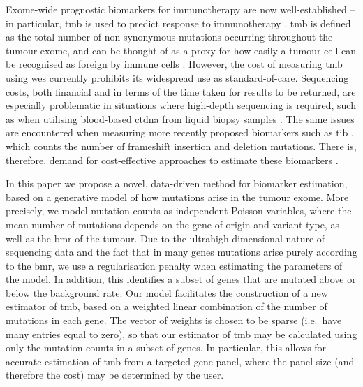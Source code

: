 \documentclass[../thesis.tex]{subfiles}
\begin{document}
Exome-wide prognostic biomarkers for immunotherapy are now well-established -- in particular, \gls{tmb} is used to predict response to immunotherapy \citep{zhu_association_2019, cao_high_2019}.  \gls{tmb} is defined as the total number of non-synonymous mutations occurring throughout the tumour exome, and can be thought of as a proxy for how easily a tumour cell can be recognised as foreign by immune cells \citep{chan_development_2019}. However, the cost of measuring \gls{tmb} using \gls{wes} \citep{sboner_real_2011} currently prohibits its widespread use as standard-of-care.  Sequencing costs, both financial and in terms of the time taken for results to be returned, are especially problematic in situations where high-depth sequencing is required, such as when utilising blood-based \gls{ctdna} from liquid biopsy samples \citep{gandara_blood-based_2018}. The same issues are encountered when measuring more recently proposed biomarkers such as \gls{tib} \citep{wu_tumor_2019,turajlic_insertion-and-deletion-derived_2017}, which counts the number of frameshift insertion and deletion mutations. There is, therefore, demand for cost-effective approaches to estimate these biomarkers \citep{fancello_tumor_2019, golkaram_interplay_2020}.

In this paper we propose a novel, data-driven method for biomarker estimation, based on a generative model of how mutations arise in the tumour exome.  More precisely, we model mutation counts as independent Poisson variables, where the mean number of mutations depends on the gene of origin and variant type, as well as the \gls{bmr} of the tumour. Due to the ultrahigh-dimensional nature of sequencing data and the fact that in many genes mutations arise purely according to the \gls{bmr}, we use a regularisation penalty when estimating the parameters of the model. In addition, this identifies a subset of genes that are mutated above or below the background rate.  Our model facilitates the construction of a new estimator of \gls{tmb}, based on a weighted linear combination of the number of mutations in each gene. The vector of weights is chosen to be sparse (i.e.~have many entries equal to zero), so that our estimator of \gls{tmb} may be calculated using only the mutation counts in a subset of genes. In particular, this allows for accurate estimation of \gls{tmb} from a targeted gene panel, where the panel size (and therefore the cost) may be determined by the user.  
\end{document}
